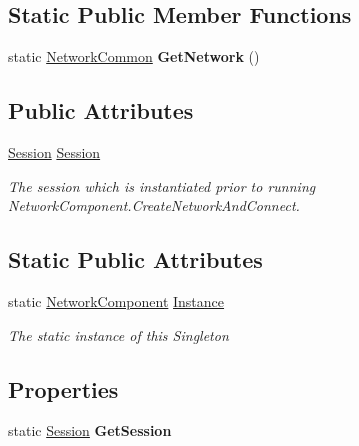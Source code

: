 \subsection*{Static Public Member Functions}
\begin{DoxyCompactItemize}
\item 
\hypertarget{class_skyrates_1_1_common_1_1_network_1_1_network_component_a19c9f558a31ba9abcdd177852d7c0020}{static \hyperlink{class_skyrates_1_1_common_1_1_network_1_1_network_common}{Network\-Common} {\bfseries Get\-Network} ()}\label{class_skyrates_1_1_common_1_1_network_1_1_network_component_a19c9f558a31ba9abcdd177852d7c0020}

\end{DoxyCompactItemize}
\subsection*{Public Attributes}
\begin{DoxyCompactItemize}
\item 
\hyperlink{class_skyrates_1_1_common_1_1_network_1_1_session}{Session} \hyperlink{class_skyrates_1_1_common_1_1_network_1_1_network_component_ab7c94c6c60a85549f3b7d22d1efcab05}{Session}
\begin{DoxyCompactList}\small\item\em The session which is instantiated prior to running Network\-Component.\-Create\-Network\-And\-Connect. \end{DoxyCompactList}\end{DoxyCompactItemize}
\subsection*{Static Public Attributes}
\begin{DoxyCompactItemize}
\item 
static \hyperlink{class_skyrates_1_1_common_1_1_network_1_1_network_component}{Network\-Component} \hyperlink{class_skyrates_1_1_common_1_1_network_1_1_network_component_a92cfb5ea7ee95888c7d9356e6e1add2f}{Instance}
\begin{DoxyCompactList}\small\item\em The static instance of this Singleton \end{DoxyCompactList}\end{DoxyCompactItemize}
\subsection*{Properties}
\begin{DoxyCompactItemize}
\item 
\hypertarget{class_skyrates_1_1_common_1_1_network_1_1_network_component_a00a4710b2204b9d524bfc04e0888ca0b}{static \hyperlink{class_skyrates_1_1_common_1_1_network_1_1_session}{Session} {\bfseries Get\-Session}}\label{class_skyrates_1_1_common_1_1_network_1_1_network_component_a00a4710b2204b9d524bfc04e0888ca0b}

\end{DoxyCompactItemize}
